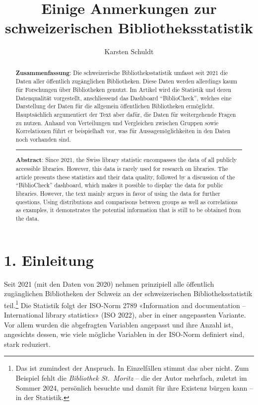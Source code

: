 \documentclass[a4paper,
fontsize=11pt,
oneside,
numbers=noperiodatend,
parskip=half-,
bibliography=totoc,
final
]{scrartcl}
\title{\LARGE{Einige Anmerkungen zur schweizerischen Bibliotheksstatistik}}%
\author{Karsten Schuldt} %
\date{}
\begin{document}
\maketitle
\thispagestyle{fancyplain} 

\begin{abstract}
\noindent
\textbf{Zusammenfassung}: Die schweizerische Bibliotheksstatistik umfasst
seit 2021 die Daten aller öffentlich zugänglichen Bibliotheken. Diese
Daten werden allerdings kaum für Forschungen über Bibliotheken genutzt.
Im Artikel wird die Statistik und deren Datenqualität vorgestellt,
anschliessend das Dashboard \enquote{BiblioCheck}, welches eine Darstellung der
Daten für die allgemein öffentlichen Bibliotheken ermöglicht.
Hauptsächlich argumentiert der Text aber dafür, die Daten für
weitergehende Fragen zu nutzen. Anhand von Verteilungen und Vergleichen
zwischen Gruppen sowie Korrelationen führt er beispielhaft vor, was für
Aussagemöglichkeiten in den Daten noch vorhanden sind.

\begin{center}\rule{0.5\linewidth}{0.5pt}\end{center}

\noindent\textbf{Abstract}: Since 2021, the Swiss library statistic encompasses
the data of all publicly accessible libraries. However, this data is
rarely used for research on libraries. The article presents these
statistics and their data quality, followed by a discussion of the
\enquote{BiblioCheck} dashboard, which makes it possible to display the data
for public libraries. However, the text mainly argues in favor of using
the data for further questions. Using distributions and comparisons
between groups as well as correlations as examples, it demonstrates the
potential information that is still to be obtained from the data.
\end{abstract}

\section{1. Einleitung}\label{einleitung}

Seit 2021 (mit den Daten von 2020) nehmen prinzipiell alle öffentlich
zugänglichen Bibliotheken der Schweiz an der schweizerischen
Bibliotheksstatistik teil.\footnote{Das ist zumindest der Anspruch. In
  Einzelfällen stimmt das aber nicht. Zum Beispiel fehlt die
  \emph{Bibliothek St.~Moritz} -- die der Autor mehrfach, zuletzt im
  Sommer 2024, persönlich besuchte und damit für ihre Existenz bürgen
  kann -- in der Statistik.} Die Statistik folgt der ISO-Norm 2789
«Information and documentation -- International library statistics» (ISO
2022), aber in einer angepassten Variante. Vor allem wurden die
abgefragten Variablen angepasst und ihre Anzahl ist, angesichts dessen,
wie viele mögliche Variablen in der ISO-Norm definiert sind, stark
reduziert.
\end{document}

